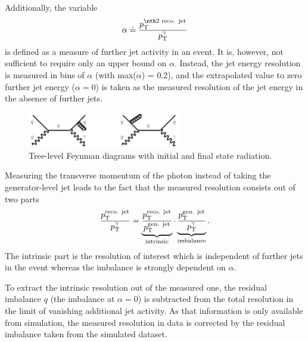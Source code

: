 Additionally, the variable 
\begin{equation*}\label{res:eq:alphaDef}
\alpha \doteq \frac{\ptsecondrecojet}{\ptgamma}
\end{equation*} 
is defined as a measure of further jet activity in an event. 
It is, however, not sufficient to require only an upper bound on $\alpha$. 
Instead, the jet energy resolution is measured in bins of $\alpha$ (with max($\alpha$) = 0.2), 
and the extrapolated value to zero further jet energy ($\alpha=0$) is taken as the measured resolution of the jet energy in the absence of further jets.
\begin{figure}[t]
  \centering
      \includegraphics[width=0.60\textwidth]{figures/resolution/generalApproach/FeynmanDiagramsWithRadiation.pdf}
  \caption{Tree-level Feynman diagrams with initial and final state radiation.}  
  \label{res:fig:FeynmanDiagramsWithRadiation}
\end{figure}

Measuring the transverse momentum of the photon instead of taking the generator-level jet \pt leads to the fact that the measured resolution consists out of two parts
\begin{equation*}\label{res:eq:splitting}
\frac{{p}_\mathrm{T}^{\text{reco. jet}}}{{p}_\mathrm{T}^{\gamma}} = \underbrace{\frac{{p}_\mathrm{T}^{\text{reco. jet}}}{{p}_\mathrm{T}^{\text{gen. jet}}}}_{\text{intrinsic}} \cdot \underbrace{\frac{{p}_\mathrm{T}^{\text{gen. jet}}}{{p}_\mathrm{T}^{\gamma}}}_{\text{imbalance}}.
\end{equation*}
The intrinsic part is the resolution of interest which is independent of further jets in the event whereas the imbalance is strongly dependent on $\alpha$.

To extract the intrinsic resolution out of the measured one, the residual imbalance $q$ (the imbalance at $\alpha = 0$) is subtracted from the total resolution in the 
limit of vanishing additional jet activity. 
As that information is only available from simulation, the measured resolution in data is corrected by the residual imbalance taken from the simulated dataset.

\FloatBarrier
